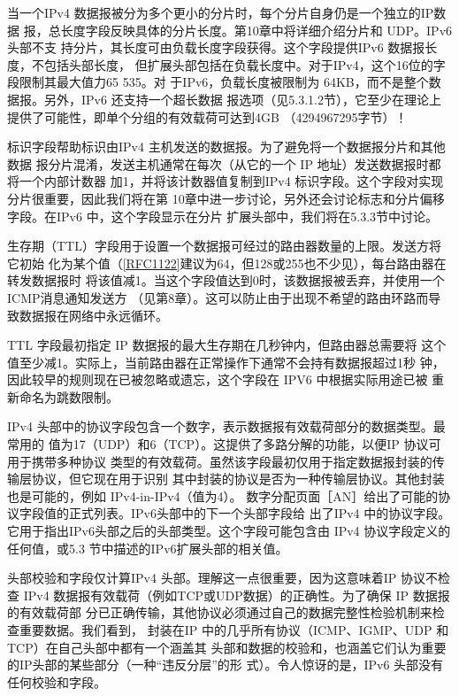 当一个IPv4 数据报被分为多个更小的分片时，每个分片自身仍是一个独立的IP数据
报，总长度字段反映具体的分片长度。第10章中将详细介绍分片和 UDP。IPv6头部不支
持分片，其长度可由负载长度字段获得。这个字段提供IPv6 数据报长度，不包括头部长度，
但扩展头部包括在负载长度中。对于IPv4，这个16位的字段限制其最大值力65 535。对
于IPv6，负载长度被限制为 64KB，而不是整个数据报。另外，IPv6 还支持一个超长数据
报选项（见5.3.1.2节），它至少在理论上提供了可能性，即单个分组的有效载荷可达到4GB
（4294967295字节）！

标识字段帮助标识由IPv4 主机发送的数据报。为了避免将一个数据报分片和其他数据
报分片混淆，发送主机通常在每次（从它的一个 IP 地址）发送数据报时都将一个内部计数器
加1，并将该计数器值复制到IPv4 标识字段。这个字段对实现分片很重要，因此我们将在第
10章中进一步讨论，另外还会讨论标志和分片偏移字段。在IPv6 中，这个字段显示在分片
扩展头部中，我们将在5.3.3节中讨论。

生存期（TTL）字段用于设置一个数据报可经过的路由器数量的上限。发送方将它初始
化为某个值（\href{https://www.rfc-editor.org/rfc/rfc1122}{[RFC1122]}建议为64，但128或255也不少见），每台路由器在转发数据报时
将该值减1。当这个字段值达到0时，该数据报被丢弃，并使用一个ICMP消息通知发送方
（见第8章）。这可以防止由于出现不希望的路由环路而导致数据报在网络中永远循环。

\begin{tcolorbox}
  TTL 字段最初指定 IP 数据报的最大生存期在几秒钟内，但路由器总需要将
  这个值至少减1。实际上，当前路由器在正常操作下通常不会持有数据报超过1秒
  钟，因此较早的规则现在已被忽略或遗忘，这个字段在 IPV6 中根据实际用途已被
  重新命名为跳数限制。
\end{tcolorbox}

IPv4 头部中的协议字段包含一个数字，表示数据报有效载荷部分的数据类型。最常用的
值为17（UDP）和6（TCP）。这提供了多路分解的功能，以便IP 协议可用于携带多种协议
类型的有效载荷。虽然该字段最初仅用于指定数据报封装的传输层协议，但它现在用于识别
其中封装的协议是否为一种传输层协议。其他封装也是可能的，例如 IPv4-in-IPv4（值为4）。
数字分配页面［AN］给出了可能的协议字段值的正式列表。IPv6头部中的下一个头部字段给
出了IPv4 中的协议字段。它用于指出IPv6头部之后的头部类型。这个字段可能包含由 IPv4
协议字段定义的任何值，或5.3 节中描述的IPv6扩展头部的相关值。

头部校验和字段仅计算IPv4 头部。理解这一点很重要，因为这意味着IP 协议不检查
IPv4 数据报有效载荷（例如TCP或UDP数据）的正确性。为了确保 IP 数据报的有效载荷部
分已正确传输，其他协议必须通过自己的数据完整性检验机制来检查重要数据。我们看到，
封装在IP 中的几乎所有协议（ICMP、IGMP、UDP 和TCP）在自己头部中都有一个涵盖其
头部和数据的校验和，也涵盖它们认为重要的IP头部的某些部分（一种“违反分层”的形
式）。令人惊讶的是，IPv6 头部没有任何校验和字段。

